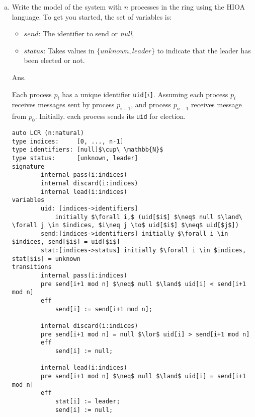 \documentclass[11pt]{article}
\begin{document}
\begin{enumerate}[(a)]
\item Write the model of the system with $n$ processes in the ring using the HIOA language. To get you started, the set of variables is: 
\begin{itemize}
\item $\mathit{send}$: The identifier to send or {\em null\/},
\item $\mathit{status}$: Takes values in $\{ \mathit{unknown},\mathit{leader}\}$ to indicate that the leader has been elected or not. 
\end{itemize}

\newcommand{\uid}[1]{\ensuremath{\mathtt{uid[}#1\mathtt{]}}}
\newcommand{\stat}[1]{\ensuremath{\mathtt{stat[}#1\mathtt{]}}}
\newcommand{\send}[1]{\ensuremath{\mathtt{send[}#1\mathtt{]}}}
\newcommand{\UID} {\ensuremath{\mathtt{uid}}}
\newcommand{\STAT}{\ensuremath{\mathtt{stat}}}
\newcommand{\SEND}{\ensuremath{\mathtt{send}}}
\newcommand{\UNKW}{\ensuremath{\mathtt{unknown}}}
\newcommand{\LEAD}{\ensuremath{\mathtt{leader}}}
Ans.

Each process $p_i$ has a unique identifier \texttt{uid[$i$]}.
Assuming each process $p_i$ receives messages sent by process $p_{i+1}$,
and process $p_{n-1}$ receives message from $p_0$. 
Initially. each process sends its \texttt{uid} for election.

\begin{lstlisting}[mathescape=true]
auto LCR (n:natural)
type indices:     [0, ..., n-1]
type identifiers: [null]$\cup\ \mathbb{N}$
type status:      [unknown, leader]
signature
        internal pass(i:indices)
        internal discard(i:indices)
        internal lead(i:indices)
variables
        uid: [indices->identifiers]
            initially $\forall i,$ (uid[$i$] $\neq$ null $\land\ \forall j \in $indices, $i\neq j \to$ uid[$i$] $\neq$ uid[$j$])
        send:[indices->identifiers] initially $\forall i \in $indices, send[$i$] = uid[$i$]
        stat:[indices->status] initially $\forall i \in $indices, stat[$i$] = unknown
transitions
        internal pass(i:indices)
        pre send[i+1 mod n] $\neq$ null $\land$ uid[i] < send[i+1 mod n]
        eff
            send[i] := send[i+1 mod n];
        
        internal discard(i:indices)
        pre send[i+1 mod n] = null $\lor$ uid[i] > send[i+1 mod n]
        eff
            send[i] := null;

        internal lead(i:indices)
        pre send[i+1 mod n] $\neq$ null $\land$ uid[i] = send[i+1 mod n]
        eff 
            stat[i] := leader;
            send[i] := null;
\end{lstlisting}


\end{enumerate}
\end{document}
